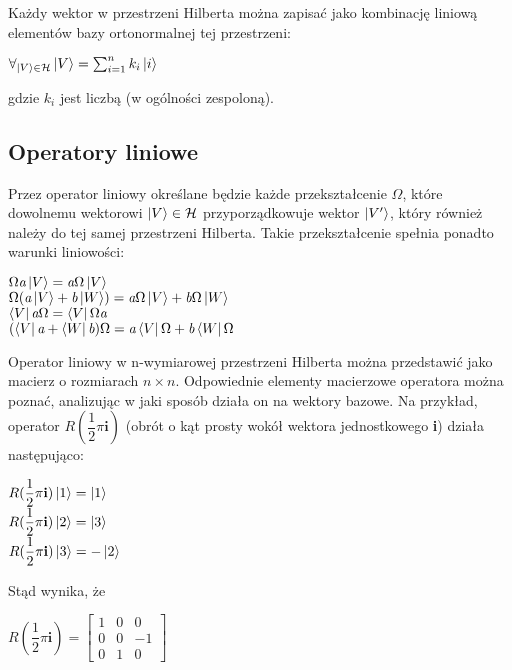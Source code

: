 \documentclass[12pt,a4paper,twoside,openany]{book}
\begin{document}
Każdy wektor w przestrzeni Hilberta można zapisać jako kombinację liniową elementów bazy ortonormalnej tej przestrzeni:
\begin{center}
    $\forall_{\ket{V}\in\mathcal{H}}\ket{V} = \sum_{i=1}^{n}k_{i}\ket{i}$
\end{center}
gdzie $k_{i}$ jest liczbą (w ogólności zespoloną).

\subsection{Operatory liniowe}
Przez operator liniowy określane będzie każde przekształcenie $\Omega$, które dowolnemu wektorowi $\ket{V} \in \mathcal{H}$ przyporządkowuje wektor $\ket{V'}$, który również należy do tej samej przestrzeni Hilberta. Takie przekształcenie spełnia ponadto warunki liniowości:
\begin{center}
    $\Omega\textit{a}\ket{V} = \textit{a}\Omega\ket{V}$ \\
    $\Omega(\textit{a}\ket{V} + \textit{b}\ket{W}) = \textit{a}\Omega\ket{V} + \textit{b}\Omega\ket{W}$ \\
    $\bra{V}\textit{a}\Omega = \bra{V}\Omega\textit{a}$ \\
    $(\bra{V}\textit{a} + \bra{W}\textit{b})\Omega = \textit{a}\bra{V}\Omega + \textit{b}\bra{W}\Omega$
\end{center}

Operator liniowy w n-wymiarowej przestrzeni Hilberta można przedstawić jako macierz o rozmiarach $n\times n$. Odpowiednie elementy macierzowe operatora można poznać, analizując w jaki sposób działa on na wektory bazowe. Na przykład, operator $R(\dfrac{1}{2}\pi\textbf{i})$ (obrót o kąt prosty wokół wektora jednostkowego \textbf{i}) działa następująco:
\begin{center}
    $R(\dfrac{1}{2}\pi\textbf{i})\ket{1} = \ket{1}$ \\
    $R(\dfrac{1}{2}\pi\textbf{i})\ket{2} = \ket{3}$ \\
    $R(\dfrac{1}{2}\pi\textbf{i})\ket{3} = -\ket{2}$
\end{center}

Stąd wynika, że
\begin{center}
    $R(\dfrac{1}{2}\pi\textbf{i}) = \begin{bmatrix}
1 & 0 & 0\\
0 & 0 & -1\\
0 & 1 & 0
\end{bmatrix}$
\end{center}
\end{document}
